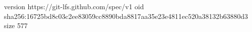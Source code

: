 version https://git-lfs.github.com/spec/v1
oid sha256:16725bd8c03c2ee83059cc8890bda8817aa35e23e4811ec520a38132b63880d3
size 577
